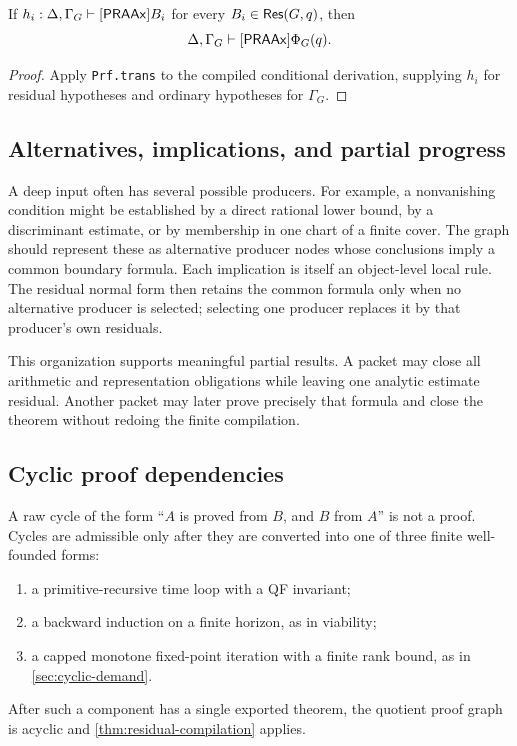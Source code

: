 \begin{corollary}\label{cor:residual-closure}
If \(h_i:\Delta,\Gamma_G\vdash[\mathsf{PRAAx}]B_i\) for every \(B_i\in\mathsf{Res}(G,q)\), then
\[
  \Delta,\Gamma_G\vdash[\mathsf{PRAAx}]\Phi_G(q).
\]
\end{corollary}

\begin{proof}
Apply \texttt{Prf.trans} to the compiled conditional derivation, supplying \(h_i\) for residual hypotheses and ordinary hypotheses for \(\Gamma_G\).
\end{proof}

\subsection{Alternatives, implications, and partial progress}

A deep input often has several possible producers.  For example, a nonvanishing condition might be established by a direct rational lower bound, by a discriminant estimate, or by membership in one chart of a finite cover.  The graph should represent these as alternative producer nodes whose conclusions imply a common boundary formula.  Each implication is itself an object-level local rule.  The residual normal form then retains the common formula only when no alternative producer is selected; selecting one producer replaces it by that producer's own residuals.

This organization supports meaningful partial results.  A packet may close all arithmetic and representation obligations while leaving one analytic estimate residual.  Another packet may later prove precisely that formula and close the theorem without redoing the finite compilation.

\subsection{Cyclic proof dependencies}

A raw cycle of the form ``\(A\) is proved from \(B\), and \(B\) from \(A\)'' is not a proof.  Cycles are admissible only after they are converted into one of three finite well-founded forms:
\begin{enumerate}[label=(\arabic*)]
  \item a primitive-recursive time loop with a QF invariant;
  \item a backward induction on a finite horizon, as in viability;
  \item a capped monotone fixed-point iteration with a finite rank bound, as in \cref{sec:cyclic-demand}.
\end{enumerate}
After such a component has a single exported theorem, the quotient proof graph is acyclic and \cref{thm:residual-compilation} applies.
